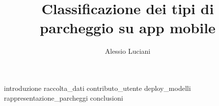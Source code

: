 \documentclass[binding=0.6cm,TFA]{sapthesis}
\title{Classificazione dei tipi di parcheggio su app mobile} \author{Alessio Luciani}
\begin{document}
\frontmatter
\maketitle
\dedication{Alla mia famiglia}
\tableofcontents
\mainmatter
\large
{introduzione}
{raccolta_dati}
{contributo_utente}
{deploy_modelli}
{rappresentazione_parcheggi}
{conclusioni}
\backmatter
\cleardoublepage
{} %
%
\end{document}
